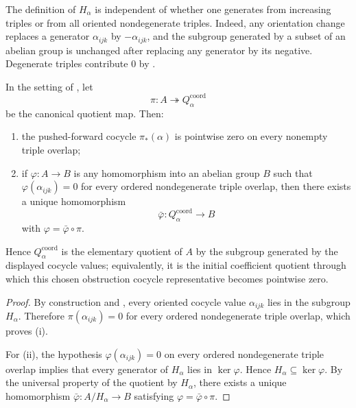 \begin{remark}\label{rem:strict-subgroup-orientation}
The definition of $H_\alpha$ is independent of whether one generates from
increasing triples or from all oriented nondegenerate triples. Indeed, any
orientation change replaces a generator $\alpha_{ijk}$ by
$-\alpha_{ijk}$, and the subgroup generated by a subset of an abelian group
is unchanged after replacing any generator by its negative. Degenerate
triples contribute $0$ by .
\end{remark}

\begin{theorem}\label{thm:initial-visible-quotient}
In the setting of , let
\[
\pi:A\twoheadrightarrow Q_{\alpha}^{\mathrm{coord}}
\]
be the canonical quotient map. Then:
\begin{enumerate}[label=(\roman*),nosep]
\item the pushed-forward cocycle $\pi_*(\alpha)$ is pointwise zero on every nonempty triple overlap;
\item if $\varphi:A\to B$ is any homomorphism into an abelian group $B$ such that $\varphi(\alpha_{ijk})=0$ for every ordered nondegenerate triple overlap, then there exists a unique homomorphism
\[
\bar\varphi:Q_{\alpha}^{\mathrm{coord}}\to B
\]
with $\varphi=\bar\varphi\circ\pi$.
\end{enumerate}
Hence \(Q_{\alpha}^{\mathrm{coord}}\) is the elementary quotient of \(A\) by the
subgroup generated by the displayed cocycle values; equivalently, it is the
initial coefficient quotient through which this chosen obstruction
cocycle representative becomes pointwise zero.
\end{theorem}

\begin{proof}
By construction and , every oriented
cocycle value $\alpha_{ijk}$ lies in the subgroup $H_\alpha$. Therefore
$\pi(\alpha_{ijk})=0$ for every ordered nondegenerate triple overlap, which
proves (i).

For (ii), the hypothesis $\varphi(\alpha_{ijk})=0$ on every ordered
nondegenerate triple overlap implies that every generator of $H_\alpha$
lies in $\ker\varphi$. Hence $H_\alpha\subseteq\ker\varphi$. By the
universal property of the quotient by $H_\alpha$, there exists a unique
homomorphism $\bar\varphi:A/H_\alpha\to B$ satisfying
$\varphi=\bar\varphi\circ\pi$.
\end{proof}

